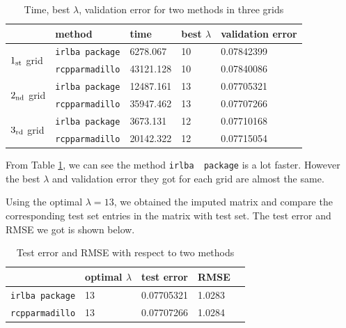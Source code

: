 \documentclass{article}
\begin{document}
	\begin{table}[!htb]
	\centering
	\caption{Time, best $\lambda$, validation error for two methods in three grids}
	\vspace{0.5em}
	\label{3grids}
		\begin{tabular}{|l|l|l|l|l|}
\hline
                                   & method               & time      & best $\lambda$ & validation error \\ \hline
\multirow{2}{*}{$1_{\rm st}$ grid} & \verb|irlba package| & 6278.067  & 10             & 0.07842399       \\ \cline{2-5} 
                                   & \verb|rcpparmadillo| & 43121.128 & 10             & 0.07840086       \\ \hline
\multirow{2}{*}{$2_{\rm nd}$ grid} & \verb|irlba package| & 12487.161 & 13             & 0.07705321       \\ \cline{2-5} 
                                   & \verb|rcpparmadillo| & 35947.462 & 13             & 0.07707266       \\ \hline
\multirow{2}{*}{$3_{\rm rd}$ grid} & \verb|irlba package| & 3673.131  & 12             & 0.07710168       \\ \cline{2-5} 
                                   & \verb|rcpparmadillo| & 20142.322 & 12            & 0.07715054       \\ \hline
\end{tabular}
	\end{table}

	From Table \ref{3grids}, we can see the method \verb|irlba  package| is a lot faster. However the best $\lambda$ and validation error they got for each grid are almost the same.

	Using the optimal $\lambda = 13$, we obtained the imputed matrix and compare the corresponding test set entries in the matrix with test set. The test error and RMSE we got is shown below.
	\begin{table}[!htb]
	\centering
		\caption{Test error and RMSE with respect to two methods}
		\vspace{0.5em}
		\begin{tabular}{|l|l|l|l|l|}
		\hline
			& optimal $\lambda$ & test error & RMSE \\ \hline
		\verb|irlba package| & 13 & 0.07705321 & 1.0283 \\ \hline
		\verb|rcpparmadillo| & 13 & 0.07707266 & 1.0284 \\ \hline
		\end{tabular}
	\end{table}
\end{document}
